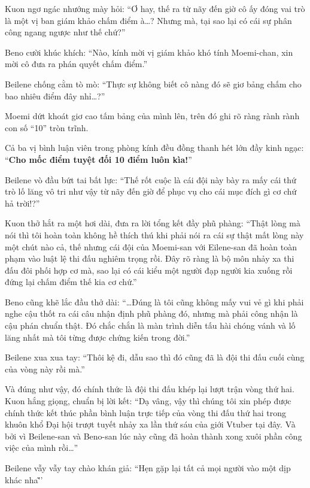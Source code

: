 \documentclass[../main.tex]{subfiles}
\begin{document}
Kuon ngơ ngác nhướng mày hỏi: ``Ơ hay, thế ra từ nãy đến giờ cô ấy đóng vai trò là một vị ban giám khảo chấm điểm à\dots? Nhưng mà, {\color{blue} tại sao lại có cái sự phân công ngang ngược như thế chứ?}''

Beno cười khúc khích: ``Nào, kính mời vị giám khảo khó tính Moemi-chan, xin mời cô đưa ra phán quyết chấm điểm.''

Beilene chống cằm tò mò: ``Thực sự không biết cô nàng đó sẽ giơ bảng chấm cho bao nhiêu điểm đây nhỉ\dots?''

Moemi dứt khoát giơ cao tấm bảng của mình lên, trên đó ghi rõ ràng rành rành con số ``10'' tròn trĩnh.

Cả ba vị bình luận viên trong phòng kính đều đồng thanh hét lớn đầy kinh ngạc: ``\textbf{Cho mốc điểm tuyệt đối 10 điểm luôn kìa!}''

Beilene vò đầu bứt tai bất lực: ``Thế rốt cuộc là cái đội này bày ra mấy cái thứ trò lố lăng vô tri như vậy từ nãy đến giờ để phục vụ cho cái mục đích gì cơ chứ hả trời!?''

Kuon thở hắt ra một hơi dài, đưa ra lời tổng kết đầy phũ phàng: ``Thật lòng mà nói thì tôi hoàn toàn không hề thích thú khi phải nói ra cái sự thật mất lòng này một chút nào cả, thế nhưng cái đội của Moemi-san với Eilene-san đã hoàn toàn phạm vào luật lệ thi đấu nghiêm trọng rồi. Đây rõ ràng là bộ môn nhảy xa thi đấu đôi phối hợp cơ mà, sao lại có cái kiểu một người đạp người kia xuống rồi đứng lại chấm điểm thế kia cơ chứ.''

Beno cũng khẽ lắc đầu thở dài: ``\dots Đúng là tôi cũng không mấy vui vẻ gì khi phải nghe cậu thốt ra cái câu nhận định phũ phàng đó, nhưng mà phải công nhận là cậu phán chuẩn thật. Đó chắc chắn là màn trình diễn tấu hài chóng vánh và lố lăng nhất mà tôi từng được chứng kiến trong đời.''

Beilene xua xua tay: ``Thôi kệ đi, dẫu sao thì đó cũng đã là đội thi đấu cuối cùng của vòng này rồi mà.''

Và đúng như vậy, đó chính thức là đội thi đấu khép lại lượt trận vòng thứ hai. Kuon hắng giọng, chuẩn bị lời kết: ``Dạ vâng, vậy thì chúng tôi xin phép được chính thức kết thúc phần bình luận trực tiếp của vòng thi đấu thứ hai trong khuôn khổ Đại hội trượt tuyết nhảy xa lần thứ sáu của giới Vtuber tại đây. Và bởi vì Beilene-san và Beno-san lúc này cũng đã hoàn thành xong xuôi phần công việc của mình rồi\dots''

Beilene vẫy vẫy tay chào khán giả: ``Hẹn gặp lại tất cả mọi người vào một dịp khác nha\~''
\end{document}
